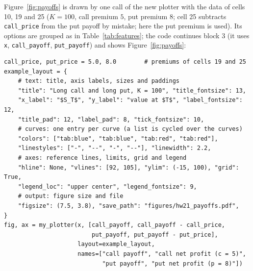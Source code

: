 \documentclass[11pt,a4paper]{article}
\newcommand{\src}[2]{\texttt{#1}, lines #2}
\newcommand{\subhead}[1]{\par\medskip\noindent{\large\bfseries #1}\par\smallskip\noindent\ignorespaces}
\begin{document}
\subhead{Example.} Figure~\ref{fig:payoffs} is drawn by one call of the new plotter with the data of cells 10, 19 and 25 ($K=100$, call premium $5$, put premium $8$; cell 25 subtracts \texttt{call\_price} from the put payoff by mistake; here the put premium is used). Its options are grouped as in Table~\ref{tab:features}; the code continues block 3 (it uses \texttt{x}, \texttt{call\_payoff}, \texttt{put\_payoff}) and shows Figure~\ref{fig:payoffs}:
\par\smallskip\noindent\begin{minipage}{\linewidth}\begin{lstlisting}[style=py,title={\src{hw21\_examples.py}{52--71} (block 4)}]
call_price, put_price = 5.0, 8.0        # premiums of cells 19 and 25
example_layout = {
    # text: title, axis labels, sizes and paddings
    "title": "Long call and long put, K = 100", "title_fontsize": 13,
    "x_label": "$S_T$", "y_label": "value at $T$", "label_fontsize": 12,
    "title_pad": 12, "label_pad": 8, "tick_fontsize": 10,
    # curves: one entry per curve (a list is cycled over the curves)
    "colors": ["tab:blue", "tab:blue", "tab:red", "tab:red"],
    "linestyles": ["-", "--", "-", "--"], "linewidth": 2.2,
    # axes: reference lines, limits, grid and legend
    "hline": None, "vlines": [92, 105], "ylim": (-15, 100), "grid": True,
    "legend_loc": "upper center", "legend_fontsize": 9,
    # output: figure size and file
    "figsize": (7.5, 3.8), "save_path": "figures/hw21_payoffs.pdf",
}
fig, ax = my_plotter(x, [call_payoff, call_payoff - call_price,
                         put_payoff, put_payoff - put_price],
                     layout=example_layout,
                     names=["call payoff", "call net profit (c = 5)",
                            "put payoff", "put net profit (p = 8)"])
\end{lstlisting}\end{minipage}\par\smallskip
\end{document}

